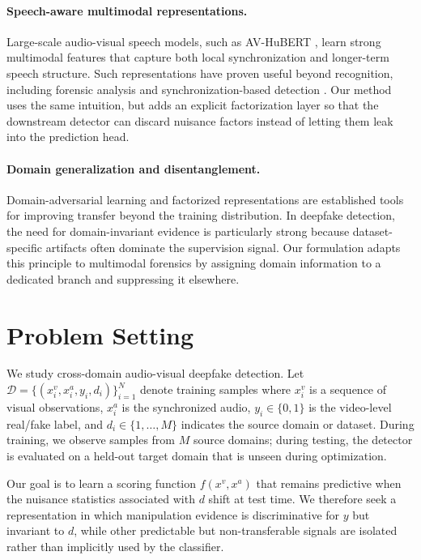 \documentclass{article}
\begin{document}
\paragraph{Speech-aware multimodal representations.}
Large-scale audio-visual speech models, such as AV-HuBERT \citep{shi2022avhubert}, learn strong multimodal features that capture both local synchronization and longer-term speech structure. Such representations have proven useful beyond recognition, including forensic analysis and synchronization-based detection \citep{liang2024speechforensics, smeu2025avhalign}. Our method uses the same intuition, but adds an explicit factorization layer so that the downstream detector can discard nuisance factors instead of letting them leak into the prediction head.

\paragraph{Domain generalization and disentanglement.}
Domain-adversarial learning \citep{ganin2016dann} and factorized representations are established tools for improving transfer beyond the training distribution. In deepfake detection, the need for domain-invariant evidence is particularly strong because dataset-specific artifacts often dominate the supervision signal. Our formulation adapts this principle to multimodal forensics by assigning domain information to a dedicated branch and suppressing it elsewhere.

\section{Problem Setting}

We study cross-domain audio-visual deepfake detection. Let $\mathcal{D} = \{(x_i^v, x_i^a, y_i, d_i)\}_{i=1}^N$ denote training samples where $x_i^v$ is a sequence of visual observations, $x_i^a$ is the synchronized audio, $y_i \in \{0,1\}$ is the video-level real/fake label, and $d_i \in \{1,\dots,M\}$ indicates the source domain or dataset. During training, we observe samples from $M$ source domains; during testing, the detector is evaluated on a held-out target domain that is unseen during optimization.

Our goal is to learn a scoring function $f(x^v, x^a)$ that remains predictive when the nuisance statistics associated with $d$ shift at test time. We therefore seek a representation in which manipulation evidence is discriminative for $y$ but invariant to $d$, while other predictable but non-transferable signals are isolated rather than implicitly used by the classifier.
\end{document}
